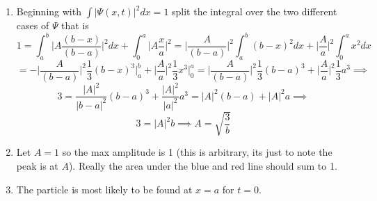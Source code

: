 \documentclass[12pt]{exam}
\begin{document}
\begin{solution}
    \begin{enumerate}
        \item Beginning with $\int |\Psi(x,t)|^2dx =1$ split the integral over the two different cases of $\Psi$ that is
        $$1 = \int^b_a \bigg|A\frac{(b-x)}{(b-a)}\bigg|^2dx + \int^a_0 \bigg|A\frac{x}{a}\bigg|^2 = 
        \bigg|\frac{A}{(b-a)}\bigg|^2\int^b_a (b-x)^2dx + \bigg|\frac{A}{a}\bigg|^2\int^a_0 x^2 dx
        $$
        $$=-\bigg|\frac{A}{(b-a)}\bigg|^2\frac{1}{3}(b-x)^3\big|^b_a + \bigg|\frac{A}{a}\bigg|^2\frac{1}{3}x^3\big|^a_0=\bigg|\frac{A}{(b-a)}\bigg|^2\frac{1}{3}(b-a)^3 + \bigg|\frac{A}{a}\bigg|^2\frac{1}{3}a^3\implies$$
        $$3 = \frac{|A|^2}{|b-a|^2}(b-a)^3 + \frac{|A|^2}{|a|^2}a^3 = |A|^2(b-a) +|A|^2a \implies$$
        $$ 3 = |A|^2b \implies A = \sqrt{\frac{3}{b}}$$
        
        \item Let $A=1$ so the max amplitude is 1 (this is arbitrary, its just to note the peak is at $A$). Really the area under the blue and red line should sum to 1. 
        
        \noindent
        \begin{minipage}[t]{0.48\textwidth}
          \centering
        \end{minipage}

        \item The particle is most likely to be found at $x=a$ for $t=0$.


\end{enumerate}
\end{solution}
\end{document}
